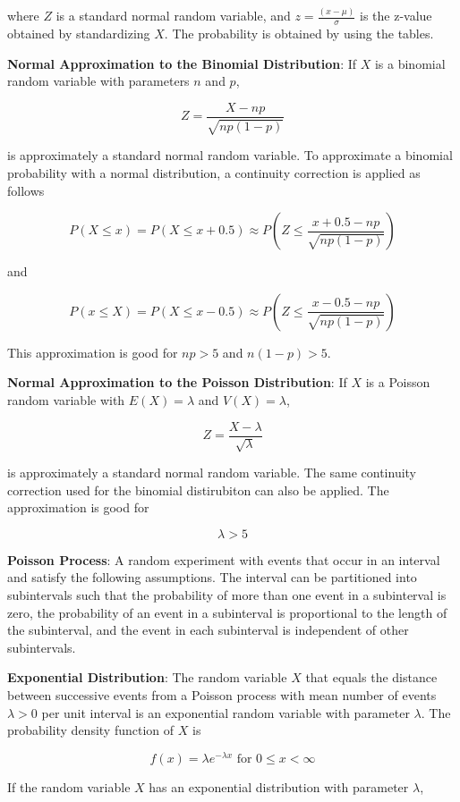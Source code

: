 \documentclass{article}
\begin{document}
where $Z$ is a standard normal random variable, and $z=\frac{(x-\mu)}{\sigma}$ is the z-value obtained by standardizing $X$. The probability is obtained by using the tables.

\noindent\textbf{\color{blue}Normal Approximation to the Binomial Distribution}: If $X$ is a binomial random variable with parameters $n$ and $p$,

\[Z=\frac{X-np}{\sqrt{np(1-p)}}\]

is approximately a standard normal random variable. To approximate a binomial probability with a normal distribution, a continuity correction is applied as follows

\[P(X\le x)=P(X\le x+0.5)\approx P(Z\le\frac{x+0.5-np}{\sqrt{np(1-p)}})\]

and

\[P(x\le X)=P(X\le x-0.5)\approx P(Z\le\frac{x-0.5-np}{\sqrt{np(1-p)}})\]

This approximation is good for $np>5$ and $n(1-p)>5$.

\noindent\textbf{\color{blue}Normal Approximation to the Poisson Distribution}: If $X$ is a Poisson random variable with $E(X)=\lambda$ and $V(X)=\lambda$,

\[Z=\frac{X-\lambda}{\sqrt{\lambda}}\]

is approximately a standard normal random variable. The same continuity correction used for the binomial distirubiton can also be applied. The approximation is good for

\[\lambda>5\]

\noindent\textbf{\color{blue}Poisson Process}: A random experiment with events that occur in an interval and satisfy the following assumptions. The interval can be partitioned into subintervals such that the probability of more than one event in a subinterval is zero, the probability of an event in a subinterval is proportional to the length of the subinterval, and the event in each subinterval is independent of other subintervals.

\noindent\textbf{\color{blue}Exponential Distribution}: The random variable $X$ that equals the distance between successive events from a Poisson process with mean number of events $\lambda>0$ per unit interval is an exponential random variable with parameter $\lambda$. The probability density function of $X$ is

\[f(x)=\lambda e^{-\lambda x}\text{ for }0\le x<\infty\]

If the random variable $X$ has an exponential distribution with parameter $\lambda$,
\end{document}
